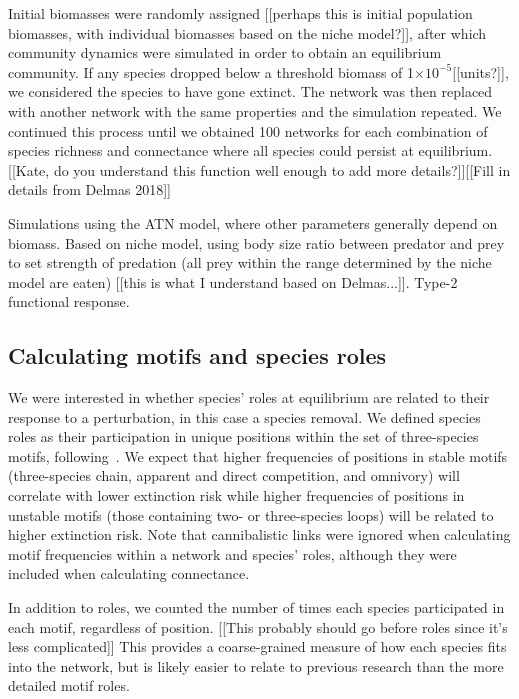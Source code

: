 \documentclass[12pt]{article}
\begin{document}
		Initial biomasses were randomly assigned  [[perhaps this is initial population biomasses, with individual biomasses based on the niche model?]], after which community dynamics were simulated in order to obtain an equilibrium community. If any species dropped below a threshold biomass of 1$\times10^{-5}$[[units?]], we considered the species to have gone extinct. The network was then replaced with another network with the same properties and the simulation repeated. We continued this process until we obtained 100 networks for each combination of species richness and connectance where all species could persist at equilibrium. [[Kate, do you understand this function well enough to add more details?]][[Fill in details from Delmas 2018]]


		Simulations using the ATN model, where other parameters generally depend on biomass. Based on niche model, using body size ratio between predator and prey to set strength of predation (all prey within the range determined by the niche model are eaten) [[this is what I understand based on Delmas...]]. Type-2 functional response.


	\subsection*{Calculating motifs and species roles}

		We were interested in whether species' roles at equilibrium are related to their response to a perturbation, in this case a species removal. We defined species roles as their participation in unique positions within the set of three-species motifs, following~\citet{Stouffer2012,Cirtwill2015}. We expect that higher frequencies of positions in stable motifs (three-species chain, apparent and direct competition, and omnivory) will correlate with lower extinction risk while higher frequencies of positions in unstable motifs (those containing two- or three-species loops) will be related to higher extinction risk.	Note that cannibalistic links were ignored when calculating motif frequencies within a network and species' roles, although they were included when calculating connectance. 


		In addition to roles, we counted the number of times each species participated in each motif, regardless of position. [[This probably should go before roles since it's less complicated]] This provides a coarse-grained measure of how each species fits into the network, but is likely easier to relate to previous research than the more detailed motif roles.
\end{document}
